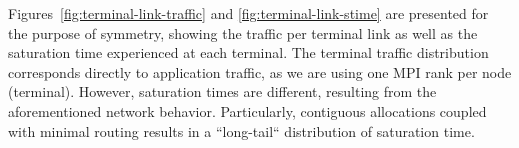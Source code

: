 Figures~\ref{fig:terminal-link-traffic} and \ref{fig:terminal-link-stime} are presented for the purpose of symmetry, 
showing the traffic per terminal link as well as the saturation time experienced at each terminal.
The terminal traffic distribution corresponds directly to application traffic, as we are using one MPI rank per node (terminal).
However, saturation times are different, resulting from the aforementioned network behavior. Particularly, contiguous allocations coupled with minimal routing results in a ``long-tail`` distribution of saturation time.

%
%
%
%
%
%



